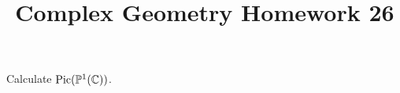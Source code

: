 \documentclass[12pt]{article}
\title{Complex Geometry Homework 26}
\author{}
\date{}
\begin{document}
\maketitle
\begin{problem}
  Calculate \(\operatorname{Pic}(\mathbb{P}^1(\mathbb{C}))\).
\end{problem}
\end{document}
